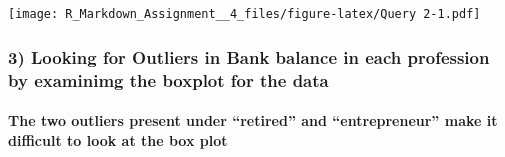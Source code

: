 \documentclass[]{article}
\newenvironment{Shaded}{\begin{snugshade}}{\end{snugshade}}
\newcommand{\KeywordTok}[1]{\textcolor[rgb]{0.13,0.29,0.53}{\textbf{#1}}}
\newcommand{\DataTypeTok}[1]{\textcolor[rgb]{0.13,0.29,0.53}{#1}}
\newcommand{\DecValTok}[1]{\textcolor[rgb]{0.00,0.00,0.81}{#1}}
\newcommand{\StringTok}[1]{\textcolor[rgb]{0.31,0.60,0.02}{#1}}
\newcommand{\OtherTok}[1]{\textcolor[rgb]{0.56,0.35,0.01}{#1}}
\newcommand{\OperatorTok}[1]{\textcolor[rgb]{0.81,0.36,0.00}{\textbf{#1}}}
\newcommand{\NormalTok}[1]{#1}
\let\oldparagraph\paragraph
\renewcommand{\paragraph}[1]{\oldparagraph{#1}\mbox{}}
\begin{document}
\begin{Shaded}
\end{Shaded}

\texttt{[image: R\_Markdown\_Assignment\_\_4\_files/figure-latex/Query 2-1.pdf]}

\subsubsection{3) Looking for Outliers in Bank balance in each
profession by examinimg the boxplot for the
data}\label{looking-for-outliers-in-bank-balance-in-each-profession-by-examinimg-the-boxplot-for-the-data}

\paragraph{\texorpdfstring{The two outliers present under ``retired''
and ``entrepreneur'' make it difficult to look at the box
plot}{The two outliers present under retired and entrepreneur make it difficult to look at the box plot}}\label{the-two-outliers-present-under-retired-and-entrepreneur-make-it-difficult-to-look-at-the-box-plot}
\end{document}
